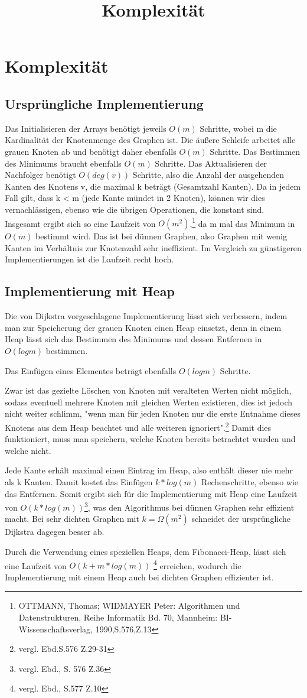\documentclass[a4paper,12pt]{article}
\title{Komplexität}
\begin{document}
\section{Komplexität}
\subsection{Ursprüngliche Implementierung}

Das Initialisieren der Arrays benötigt jeweils $O(m)$ Schritte, wobei m die Kardinalität der Knotenmenge des Graphen ist.
Die äußere Schleife arbeitet alle grauen Knoten ab und benötigt daher ebenfalls $O(m)$ Schritte. Das Bestimmen des Minimums braucht ebenfalls $O(m)$ Schritte.
Das Aktualisieren der Nachfolger benötigt $O(deg(v))$ Schritte, also die Anzahl der ausgehenden Kanten des Knotens v, die maximal k beträgt (Gesamtzahl Kanten). Da in jedem Fall gilt, dass k < m (jede Kante mündet in 2 Knoten), können wir dies vernachlässigen, ebenso wie die übrigen Operationen, die konstant sind.
Insgesamt ergibt sich so eine Laufzeit von $O(m^{2})$,\footnote{OTTMANN, Thomas; WIDMAYER Peter: Algorithmen und Datenstrukturen, Reihe Informatik Bd. 70, Mannheim: BI-Wissenschaftsverlag, 1990,S.576,Z.13} da m mal das Minimum in $O(m)$ bestimmt wird.
Das ist bei dünnen Graphen, also Graphen mit wenig Kanten im Verhältnis zur Knotenzahl sehr ineffizient. Im Vergleich zu günstigeren Implementierungen ist die Laufzeit recht hoch.

\subsection{Implementierung mit Heap}
Die von Dijkstra vorgeschlagene Implementierung lässt sich verbessern, indem man zur Speicherung der grauen Knoten einen Heap einsetzt, denn in einem Heap lässt sich das Bestimmen des Minimums und dessen Entfernen in $O(log m)$ bestimmen.

\parindent0pt Das Einfügen eines Elementes beträgt ebenfalls $O(log m)$ Schritte.

\parindent0pt Zwar ist das gezielte Löschen von Knoten mit veralteten Werten nicht möglich, sodass eventuell mehrere Knoten mit gleichen Werten existieren, dies ist jedoch nicht weiter schlimm, "wenn man für jeden Knoten nur die erste Entnahme dieses Knotens aus dem Heap beachtet und alle weiteren ignoriert".\footnote{vergl. Ebd.S.576 Z.29-31} Damit dies funktioniert, muss man speichern, welche Knoten bereits betrachtet wurden und welche nicht.

\parindent0pt Jede Kante erhält maximal einen Eintrag im Heap, also enthält dieser nie mehr als k Kanten. Damit kostet das Einfügen $k*log(m)$ Rechenschritte, ebenso wie das Entfernen. Somit ergibt sich für die Implementierung mit Heap eine Laufzeit von $O(k*log(m))$\footnote{vergl. Ebd., S. 576 Z.36}, was den Algorithmus bei dünnen Graphen sehr effizient macht.
Bei sehr dichten Graphen mit $k = \Omega (m^{2})$ schneidet der ursprüngliche Dijkstra dagegen besser ab.

\parindent0pt Durch die Verwendung eines speziellen Heaps, dem Fibonacci-Heap, lässt sich eine Laufzeit von $O(k + m * log(m))$ \footnote{vergl. Ebd., S.577 Z.10} erreichen, wodurch die Implementierung mit einem Heap auch bei dichten Graphen effizienter ist.
\end{document}
